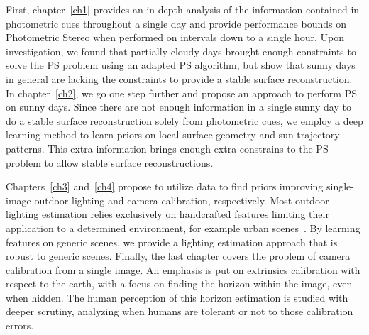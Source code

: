 First, chapter~\ref{ch1} provides an in-depth analysis of the information contained in photometric cues throughout a single day and provide performance bounds on Photometric Stereo when performed on intervals down to a single hour. Upon investigation, we found that partially cloudy days brought enough constraints to solve the PS problem using an adapted PS algorithm, but show that sunny days in general are lacking the constraints to provide a stable surface reconstruction. In chapter~\ref{ch2}, we go one step further and propose an approach to perform PS on sunny days. Since there are not enough information in a single sunny day to do a stable surface reconstruction solely from photometric cues, we employ a deep learning method to learn priors on local surface geometry and sun trajectory patterns. This extra information brings enough extra constrains to the PS problem to allow stable surface reconstructions.

Chapters~\ref{ch3} and~\ref{ch4} propose to utilize data to find priors improving single-image outdoor lighting and camera calibration, respectively. Most outdoor lighting estimation relies exclusively on handcrafted features limiting their application to a determined environment, for example urban scenes~\cite{lalonde-ijcv-12}. By learning features on generic scenes, we provide a lighting estimation approach that is robust to generic scenes. Finally, the last chapter covers the problem of camera calibration from a single image. An emphasis is put on extrinsics calibration with respect to the earth, with a focus on finding the horizon within the image, even when hidden. The human perception of this horizon estimation is studied with deeper scrutiny, analyzing when humans are tolerant or not to those calibration errors.






